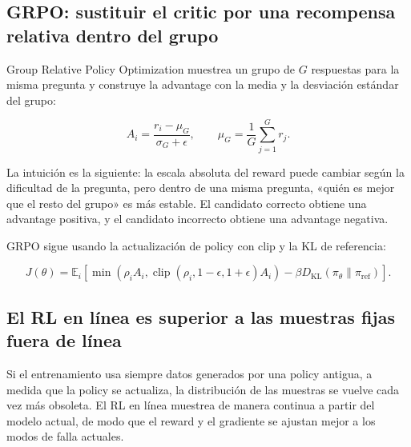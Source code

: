 
\subsection{GRPO: sustituir el critic por una recompensa relativa dentro del grupo}

Group Relative Policy Optimization muestrea un grupo de $G$ respuestas para la misma pregunta y construye la advantage con la media y la desviación estándar del grupo:

$$
A_i=\frac{r_i-\mu_G}{\sigma_G+\epsilon},
\qquad
\mu_G=\frac{1}{G}\sum_{j=1}^{G}r_j.
$$


La intuición es la siguiente: la escala absoluta del reward puede cambiar según la dificultad de la pregunta, pero dentro de una misma pregunta, «quién es mejor que el resto del grupo» es más estable. El candidato correcto obtiene una advantage positiva, y el candidato incorrecto obtiene una advantage negativa.

GRPO sigue usando la actualización de policy con clip y la KL de referencia:

$$
J(\theta)=\mathbb E_i\left[
\min(\rho_i A_i,\operatorname{clip}(\rho_i,1-\epsilon,1+\epsilon)A_i)
-\beta D_{\mathrm{KL}}(\pi_\theta\|\pi_{\mathrm{ref}})
\right].
$$


\subsection{El RL en línea es superior a las muestras fijas fuera de línea}

Si el entrenamiento usa siempre datos generados por una policy antigua, a medida que la policy se actualiza, la distribución de las muestras se vuelve cada vez más obsoleta. El RL en línea muestrea de manera continua a partir del modelo actual, de modo que el reward y el gradiente se ajustan mejor a los modos de falla actuales.

